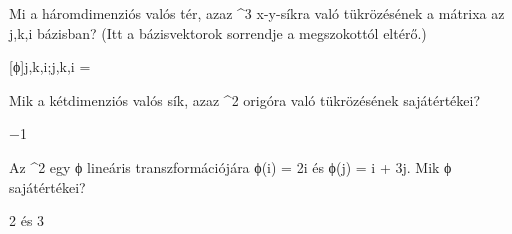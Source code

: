 \begin{frame}
  \begin{tcolorbox}[title={9/2. -R-}]
    Mi a háromdimenziós valós tér, azaz ^3 x-y-síkra való tükrözésének a mátrixa az j,k,i bázisban? (Itt a bázisvektorok sorrendje a megszokottól eltérő.)

  \tcblower

    \mmedskip 
    
     [ϕ]j,k,i;j,k,i =
  \end{tcolorbox}
\end{frame}


\begin{frame}
  \begin{tcolorbox}[title={9/3. -N-}]
    Mik a kétdimenziós valós sík, azaz ^2 origóra való tükrözésének sajátértékei?

  \tcblower

    \mmedskip 
    
    −1
  \end{tcolorbox}
\end{frame}


\begin{frame}
  \begin{tcolorbox}[title={9/4. -R-}]
    Az ^2 egy ϕ lineáris transzformációjára ϕ(i) = 2i és ϕ(j) = i + 3j. Mik ϕ sajátértékei? 
    
  \tcblower

    \mmedskip 
    
     2 és 3
  \end{tcolorbox}
\end{frame}


